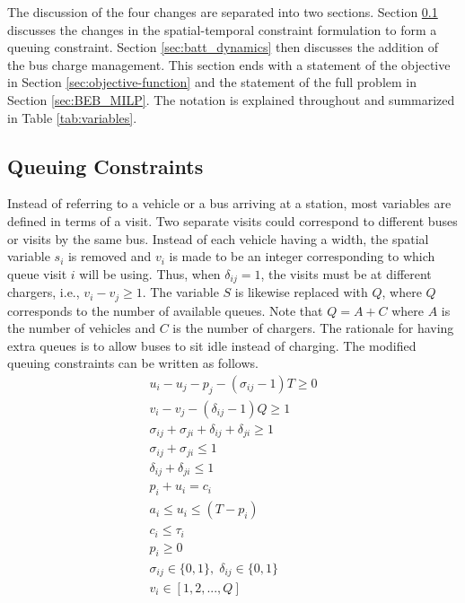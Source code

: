 \documentclass[letterpaper, 10pt, conference]{IEEEtran}
\begin{document}
The discussion of the four changes are separated into two sections. Section \ref{sec:queuing} discusses the changes in
the spatial-temporal constraint formulation to form a queuing constraint. Section \ref{sec:batt_dynamics} then discusses
the addition of the bus charge management. This section ends with a statement of the objective in Section
\ref{sec:objective-function} and the statement of the full problem in Section \ref{sec:BEB_MILP}. The notation is
explained throughout and summarized in Table \ref{tab:variables}.

\subsection{Queuing Constraints}
\label{sec:queuing}
\noindent
Instead of referring to a vehicle or a bus arriving at a station, most variables are defined in terms of a visit. Two
separate visits could correspond to different buses or visits by the same bus. Instead of each vehicle having a width,
the spatial variable $s_i$ is removed and $v_i$ is made to be an integer corresponding to which queue visit $i$ will be
using. Thus, when $\delta_{ij} = 1$, the visits must be at different chargers, i.e., $v_i-v_j \geq 1$. The variable $S$ is
likewise replaced with $Q$, where $Q$ corresponds to the number of available queues. Note that $Q = A + C$ where $A$ is
the number of vehicles and $C$ is the number of chargers. The rationale for having extra queues is to allow buses to sit
idle instead of charging. The modified queuing constraints can be written as follows.
\begin{subequations}
\label{eq:packconstrs}
\begin{align}
    u_i - u_j - p_j - (\sigma_{ij} - 1)T \geq 0                      \label{subeq:time}         \\
    v_i - v_j - (\delta_{ij} - 1)Q \geq 1                            \label{subeq:space}        \\
    \sigma_{ij} + \sigma_{ji} + \delta_{ij} + \delta_{ji} \geq 1     \label{subeq:valid_pos}    \\
    \sigma_{ij} + \sigma_{ji} \leq 1                                 \label{subeq:sigma}        \\
    \delta_{ij} + \delta_{ji} \leq 1                                 \label{subeq:delta}        \\
    p_i + u_i = c_i                                                  \label{subeq:detach}       \\
    a_i \leq u_i \leq (T - p_i)                                      \label{subeq:valid_starts} \\
    c_i \leq \tau_i                                                  \label{subeq:valid_depart} \\
    p_i \geq 0                                                       \label{subeq:pos_charge} \\
    \sigma_{ij} \in \{0,1\},\;\delta_{ij} \in \{0,1\}                \label{subeq:sdspace}      \\
    v_i \in [1,2, ... , Q]                                           \label{subeq:vspace}
\end{align}
\end{subequations}
\end{document}
